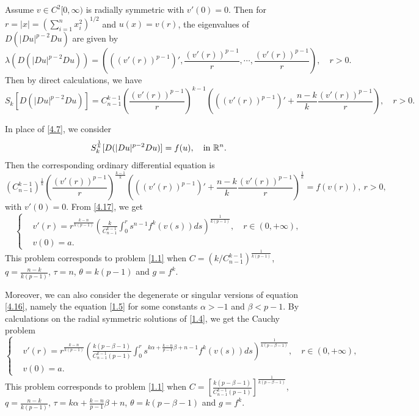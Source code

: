 \documentclass[a4paper,11pt]{amsart}
\theoremstyle{plain}
\theoremstyle{remark}
\numberwithin{equation}{section}
\numberwithin{figure}{section}
\numberwithin{remark}{section}
\begin{document}
\begin{sloppypar}
Assume $v\in C^2[0, \infty)$ is radially symmetric with $v'(0)=0$. Then for $r=|x|=(\sum\limits_{i=1}^n x_i^2)^{1/2}$ and  $u(x)=v(r)$, the eigenvalues of $D(|Du|^{p-2}Du)$ are given by
	\begin{equation}\label{4.14}
	\lambda (D(|Du|^{p-2}Du)) = \left ( ((v'(r))^{p-1})', \frac{(v'(r))^{p-1}}{r}, \cdots, \frac{(v'(r))^{p-1}}{r} \right), \quad r>0.
	\end{equation}
Then by direct calculations, we have	
	\begin{equation}\label{4.15}
	S_k [D(|Du|^{p-2}Du)]=C_{n-1}^{k-1}\left(\frac{(v'(r))^{p-1}}{r}\right)^{k-1}\left(((v'(r))^{p-1})'+\frac{n-k}{k}\frac{(v'(r))^{p-1}}{r}\right), \quad r>0.
	\end{equation}
	
In place of \eqref{4.7}, we consider
	\begin{equation}\label{4.16}
	S_k^{\frac{1}{k}} [D(|Du|^{p-2}Du)] = f(u), \quad {\rm in} \ \mathbb{R}^n.
	\end{equation}
Then the corresponding ordinary differential equation is
	\begin{equation}\label{4.17}
	\left(C_{n-1}^{k-1}\right)^{\frac{1}{k}}\left(\frac{(v'(r))^{p-1}}{r}\right)^{\frac{k-1}{k}}\left(((v'(r))^{p-1})'+\frac{n-k}{k}\frac{(v'(r))^{p-1}}{r}\right)^\frac{1}{k} = f(v(r)), \ r>0,
	\end{equation}
with $v'(0)=0$. From \eqref{4.17}, we get
	\begin{equation}\label{4.18}
	\left\{
	\begin{aligned}
	&v'(r)= r^{\frac{k-n}{k(p-1)}}  \left( \frac{k}{C_{n-1}^{k-1}}  \int_{0}^{r} s^{n-1} f^{k} (v(s))ds \right )^{\frac{1}{k(p-1)}}, \quad r\in (0, +\infty), \\
	&v(0)=a.
	\end{aligned}
	\right.
	\end{equation}
	This problem corresponds to problem \eqref{1.1} when $C=\left (k/C_{n-1}^{k-1} \right )^{\frac{1}{k(p-1)}}$, $q=\frac{n-k}{k(p-1)}$, $\tau =n$, $\theta =k(p-1)$ and $g=f^k$.
	
	Moreover, we can also consider the degenerate or singular versions of equation \eqref{4.16}, namely the equation \eqref{1.5} for some constants $\alpha>-1$ and $\beta<p-1$.
By calculations on the radial symmetric solutions of \eqref{1.4}, we get the Cauchy problem
	\begin{equation}\label{4.20}
	\left\{
	\begin{aligned}
	&v'(r)= r^{\frac{k-n}{k(p-1)}}  \left( \frac{k(p-\beta-1)}{C_{n-1}^{k-1}(p-1)} \int_{0}^{r} s^{k\alpha+\frac{k-n}{p-1}\beta+n-1} f^{k} (v(s))ds \right )^{\frac{1}{k(p-\beta-1)}}, \quad r\in (0, +\infty), \\
	&v(0)=a.
	\end{aligned}
	\right.
	\end{equation}
	This problem corresponds to problem \eqref{1.1} when $C=\left[ \frac{k(p-\beta-1)}{C_{n-1}^{k-1}(p-1)} \right]^{\frac{1}{k(p-\beta-1)}}$, $q=\frac{n-k}{k(p-1)}$, $\tau =k\alpha+\frac{k-n}{p-1}\beta+n$, $\theta =k(p-\beta-1)$ and $g=f^k$.




\end{sloppypar}
\end{document}
